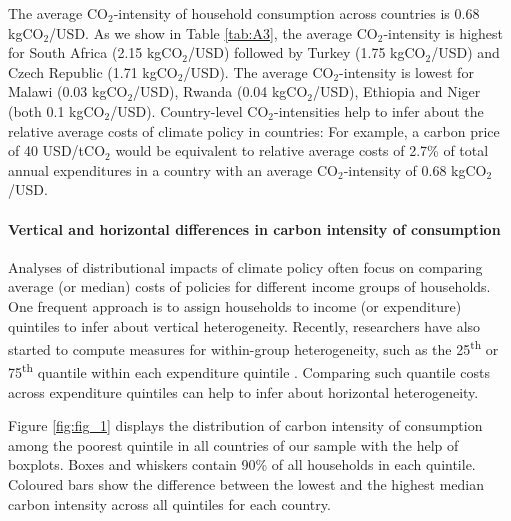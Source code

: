 \documentclass[12pt, a4paper]{article}
\begin{document}

The average CO$_{2}$-intensity of household consumption across countries is 0.68 kgCO$_{2}$/USD. As we show in Table \ref{tab:A3}, the average CO$_{2}$-intensity is highest for South Africa (2.15 kgCO$_{2}$/USD) followed by Turkey (1.75 kgCO$_{2}$/USD) and Czech Republic (1.71 kgCO$_{2}$/USD). The average CO$_{2}$-intensity is lowest for Malawi (0.03 kgCO$_{2}$/USD), Rwanda (0.04 kgCO$_{2}$/USD), Ethiopia and Niger (both 0.1 kgCO$_{2}$/USD). Country-level CO$_{2}$-intensities help to infer about the relative average costs of climate policy in countries: For example, a carbon price of 40 USD/tCO$_{2}$ \autocite{Stiglitz.2017b} would be equivalent to relative average costs of 2.7\% of total annual expenditures in a country with an average CO$_{2}$-intensity of 0.68 kgCO$_{2}$/USD.


\paragraph{Vertical and horizontal differences in carbon intensity of consumption}

Analyses of distributional impacts of climate policy often focus on comparing average (or median) costs of policies for different income groups of households. One frequent approach is to assign households to income (or expenditure) quintiles to infer about vertical heterogeneity. Recently, researchers have also started to compute measures for within-group heterogeneity, such as the 25\textsuperscript{th} or 75\textsuperscript{th} quantile within each expenditure quintile \autocite{Cronin.2019, Missbach.2024}. Comparing such quantile costs across expenditure quintiles can help to infer about horizontal heterogeneity.

Figure \ref{fig:fig_1} displays the distribution of carbon intensity of consumption among the poorest quintile in all countries of our sample with the help of boxplots. Boxes and whiskers contain 90\% of all households in each quintile. Coloured bars show the difference between the lowest and the highest median carbon intensity across all quintiles for each country.
\end{document}
